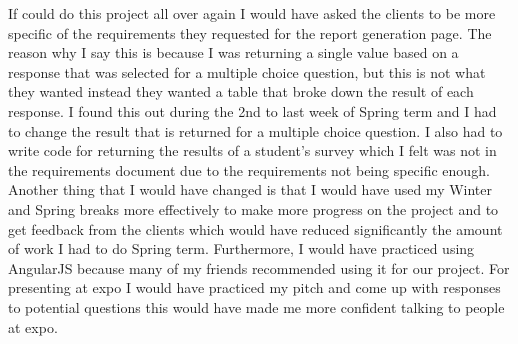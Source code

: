 \documentclass[../final.tex]{subfiles}
\begin{document}
 If could do this project all over again I would have asked the clients to be more specific of the requirements they requested for the report generation page. The reason why I say this is because I was returning a single value based on a response that was selected for a multiple choice question, but this is not what they wanted instead they wanted a table that broke down the result of each response. I found this out during the 2nd to last week of Spring term and I had to change the result that is returned for a multiple choice question. I also had to write code for returning the results of a student's survey which I felt was not in the requirements document due to the requirements not being specific enough.
 Another thing that I would have changed is that I would have used my Winter and Spring breaks more effectively to make more progress on the project and to get feedback from the clients which would have reduced significantly the amount of work I had to do Spring term. Furthermore, I would have practiced using AngularJS because many of my friends recommended using it for our project. For presenting at expo I would have practiced my pitch and come up with responses to potential questions this would have made me more confident talking to people at expo. 
\end{document}
